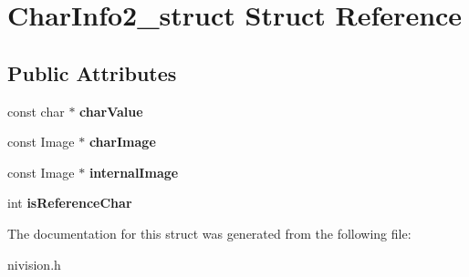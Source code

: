 \hypertarget{structCharInfo2__struct}{\section{\-Char\-Info2\-\_\-struct \-Struct \-Reference}
\label{structCharInfo2__struct}
}
\subsection*{\-Public \-Attributes}
\begin{DoxyCompactItemize}
\item 
\hypertarget{structCharInfo2__struct_ace98064baf5022d1c9410fc4f4e07b6c}{const char $\ast$ {\bfseries char\-Value}}\label{structCharInfo2__struct_ace98064baf5022d1c9410fc4f4e07b6c}

\item 
\hypertarget{structCharInfo2__struct_a3c714a19bd4dbb0ecdc049932ac17ddd}{const \-Image $\ast$ {\bfseries char\-Image}}\label{structCharInfo2__struct_a3c714a19bd4dbb0ecdc049932ac17ddd}

\item 
\hypertarget{structCharInfo2__struct_a59a516a2b608303c87782feac8715751}{const \-Image $\ast$ {\bfseries internal\-Image}}\label{structCharInfo2__struct_a59a516a2b608303c87782feac8715751}

\item 
\hypertarget{structCharInfo2__struct_a56a8c5744ef30e966342f493378e7c86}{int {\bfseries is\-Reference\-Char}}\label{structCharInfo2__struct_a56a8c5744ef30e966342f493378e7c86}

\end{DoxyCompactItemize}


\-The documentation for this struct was generated from the following file\-:\begin{DoxyCompactItemize}
\item 
nivision.\-h\end{DoxyCompactItemize}
